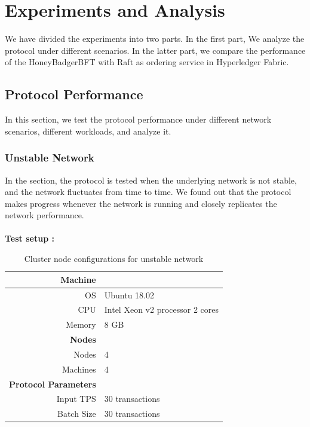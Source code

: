 \chapter{Experiments and Analysis}
\label{ch:result}

    We have divided the experiments into two parts. In the first part, We analyze the protocol under different scenarios. In the latter part, we compare the performance of the HoneyBadgerBFT with Raft as ordering service in Hyperledger Fabric.
    \section{Protocol Performance}
    In this section, we test the protocol performance under different network scenarios, different workloads, and analyze it.
    \subsection{Unstable Network}
    In the section, the protocol is tested when the underlying network is not stable, and the network fluctuates from time to time. We found out that the protocol makes progress whenever the network is running and closely replicates the network performance.
    \\\\
   \textbf{Test setup :}\\
\begin{table}[!h]
\centering
\begin{tabular}{ |r|  l| }
\hline
 \textbf{Machine}&  \\
 \hline
  OS & Ubuntu 18.02 \\  
   CPU & Intel Xeon v2 processor 2 cores \\
  Memory &8 GB\\
  \hline
  \textbf{Nodes}&\\
  \hline
Nodes  &4 \\
Machines & 4\\
\hline
\textbf{Protocol Parameters}&\\
\hline
Input TPS & 30 transactions\\
Batch Size & 30 transactions\\
  \hline
\end{tabular}
\caption{Cluster node configurations for unstable network}
\end{table}

